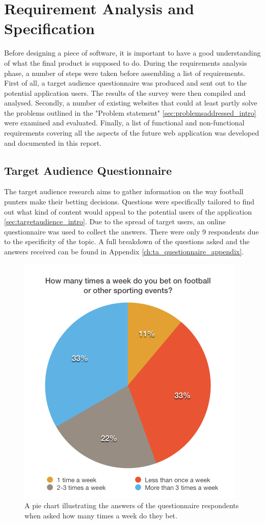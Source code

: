 \chapter{Requirement Analysis and Specification}
\label{ch:requirementanalysis}
Before designing a piece of software, it is important to have a good understanding of what the final product is supposed to do. During the requirements analysis phase, a number of steps were taken before assembling a list of requirements. First of all, a target audience questionnaire was produced and sent out to the potential application users. The results of the survey were then compiled and analysed. Secondly, a number of existing websites that could at least partly solve the problems outlined in the "Problem statement" \ref{sec:problemsaddressed_intro}  were examined and evaluated. Finally, a list of functional and non-functional requirements covering all the aspects of the future web application was developed and documented in this report.

\section{Target Audience Questionnaire}
\label{sec:targetaudiencequestionnaire_req}
The target audience research aims to gather information on the way football punters make their betting decisions. Questions were specifically tailored to find out what kind of content would appeal to the potential users of the application \ref{sec:targetaudience_intro}. Due to the spread of target users, an online questionnaire was used to collect the answers. There were only 9 respondents due to the specificity of the topic. A full breakdown of the questions asked and the answers received can be found in Appendix \ref{ch:ta_questionnaire_appendix}.

\begin{figure}[H]
	\begin{center}
		\includegraphics[width=.50\columnwidth]{req/images/howMuchDoYouBet.png}
		\caption{A pie chart illustrating the answers of the questionnaire respondents when asked how many times a week do they bet.} \label{fig:using:howmuchdoyoubet}
	\end{center}
\end{figure}


